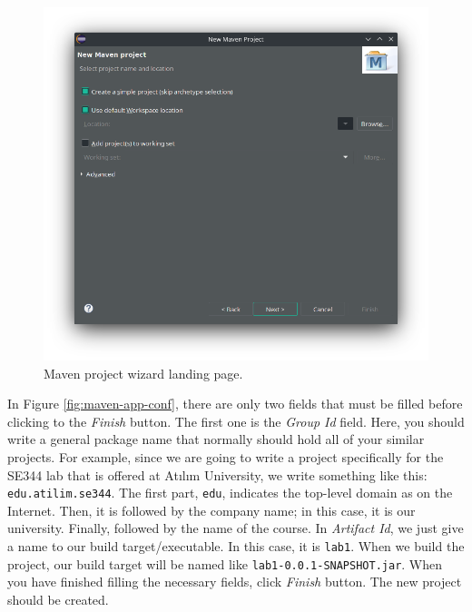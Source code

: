 \begin{figure}[H]
    \centering
    \includegraphics[width=\textwidth]{images/maven-new.png}
    \caption{Maven project wizard landing page.}
    \label{fig:maven-new}
\end{figure}

In Figure \ref{fig:maven-app-conf}, there are only two fields that must be filled before clicking to the \emph{Finish} button. The first one is the \emph{Group Id} field. Here, you should write a general package name that normally should hold all of your similar projects. For example, since we are going to write a project specifically for the SE344 lab that is offered at Atılım University, we write something like this: \verb|edu.atilim.se344|. The first part, \verb|edu|, indicates the top-level domain as on the Internet. Then, it is followed by the company name; in this case, it is our university. Finally, followed by the name of the course. In \emph{Artifact Id}, we just give a name to our build target/executable. In this case, it is \verb|lab1|. When we build the project, our build target will be named like \verb|lab1-0.0.1-SNAPSHOT.jar|. When you have finished filling the necessary fields, click \emph{Finish} button. The new project should be created.

